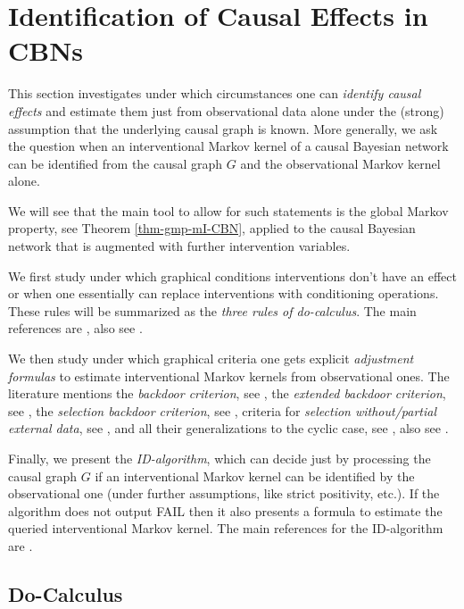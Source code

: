\section{Identification of Causal Effects in CBNs}

This section investigates under which circumstances one can \emph{identify causal effects} and estimate them just from observational data alone under the (strong) assumption that the underlying causal graph is known. More generally, we ask the question when an interventional Markov kernel of a causal Bayesian network can be identified from the causal graph $G$ and the observational Markov kernel alone.

We will see that the main tool to allow for such statements is the global Markov property, see Theorem \ref{thm-gmp-mI-CBN}, applied to the causal Bayesian network that is augmented with further intervention variables.

We first study under which graphical conditions interventions don't have an effect or when one essentially can replace interventions with conditioning operations. These rules will be summarized as the \emph{three rules of do-calculus}. The main references are \cite{Pearl93as,Pearl93bs,Pearl09}, also see \cite{Pearl95s,FM20,For21}.

We then study under which graphical criteria one gets explicit \emph{adjustment formulas} to estimate interventional Markov kernels from observational ones. The literature mentions the \emph{backdoor criterion}, see \cite{Pearl93as,Pearl93bs,Pearl09}, 
the \emph{extended backdoor criterion}, see \cite{PearlPaz13,SWR10s}, the \emph{selection backdoor criterion}, see \cite{BTP14s},
criteria for \emph{selection without/partial external data}, see \cite{CB17s,CTB18s}, and all their generalizations to the cyclic case,  see \cite{FM20}, also see \cite{SP06s,PTKM15s,For21}.

Finally, we present the \emph{ID-algorithm}, which can decide just by processing the causal graph $G$ if an interventional Markov kernel can be identified by the observational one (under further assumptions, like strict positivity, etc.). If the algorithm does not output FAIL then it also presents a formula to estimate the queried interventional Markov kernel. 
The main references for the ID-algorithm are \cite{Pearl09,GP95s,Tian2002,TP02s,Tian04s,SP06,HV06s,HV08s,RERS17,FM20}.




\subsection{Do-Calculus}

